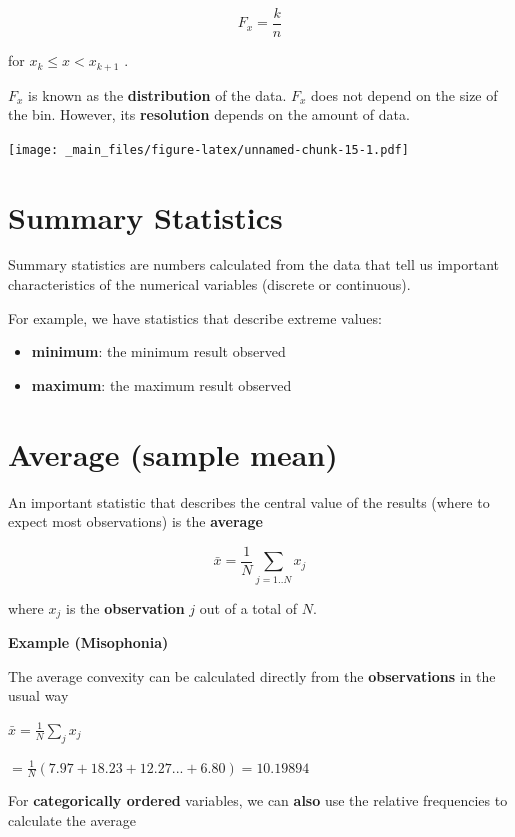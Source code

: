 \documentclass[
]{book}
\providecommand{\tightlist}{%
  \setlength{\itemsep}{0pt}\setlength{\parskip}{0pt}}
\begin{document}
\[F_x = \frac{k}{ n}\]

for \(x_{k} \leq x < x_{k+ 1}\) .

\(F_x\) is known as the \textbf{distribution} of the data. \(F_x\) does not depend on the size of the bin. However, its \textbf{resolution} depends on the amount of data.

\texttt{[image: \_main\_files/figure-latex/unnamed-chunk-15-1.pdf]}

\hypertarget{summary-statistics}{%
\section{Summary Statistics}\label{summary-statistics}}

Summary statistics are numbers calculated from the data that tell us important characteristics of the numerical variables (discrete or continuous).

For example, we have statistics that describe extreme values:

\begin{itemize}
\tightlist
\item
  \textbf{minimum}: the minimum result observed
\item
  \textbf{maximum}: the maximum result observed
\end{itemize}

\hypertarget{average-sample-mean}{%
\section{Average (sample mean)}\label{average-sample-mean}}

An important statistic that describes the central value of the results (where to expect most observations) is the \textbf{average}

\[\bar{x}=\frac{1}{N} \sum_{j= 1..N } x_j \]

where \(x_j\) is the \textbf{observation} \(j\) out of a total of \(N\).

\textbf{Example (Misophonia)}

The average convexity can be calculated directly from the \textbf{observations} in the usual way

\(\bar{x}= \frac{1}{ N}\sum_j x_j\)

\(= \frac{1}{ N}( 7.97 + 18.23 + 12.27... + 6.80) = 10.19894\)

For \textbf{categorically ordered} variables, we can \textbf{also} use the relative frequencies to calculate the average
\end{document}
